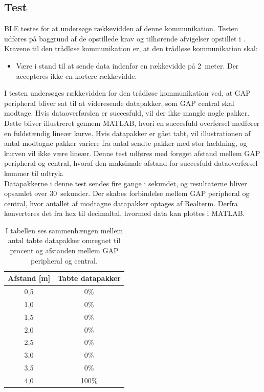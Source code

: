\subsection{Test}
BLE testes for at undersøge rækkevidden af denne kommunikation. Testen udføres på baggrund af de opstillede krav og tilhørende afvigelser opstillet i . Kravene til den trådløse kommunikation er, at den trådløse kommunikation skal:
\begin{itemize}
	\item Være i stand til at sende data indenfor en rækkevidde på 2~meter. Der accepteres ikke en kortere rækkevidde.
\end{itemize}
I testen undersøges rækkevidden for den trådløse kommunikation ved, at GAP peripheral bliver sat til at videresende datapakker, som GAP central skal modtage. Hvis dataoverførslen er succesfuld, vil der ikke mangle nogle pakker. Dette bliver illustreret gennem MATLAB, hvori en succesfuld overførsel medfører en fuldstændig lineær kurve. Hvis datapakker er gået tabt, vil illustrationen af antal modtagne pakker variere fra antal sendte pakker med stor hældning, og kurven vil ikke være lineær. Denne test udføres med forøget afstand mellem GAP peripheral og central, hvoraf den maksimale afstand for succesfuld dataoverførsel kommer til udtryk. \\
Datapakkerne i denne test sendes fire gange i sekundet, og resultaterne bliver opsamlet over 30~sekunder. Der skabes forbindelse mellem GAP peripheral og central, hvor antallet af modtagne datapakker optages af Realterm. Derfra konverteres det fra hex til decimaltal, hvormed data kan plottes i MATLAB.
\begin{table}[H]
	\centering
	\begin{tabular}{cc}
			\hline
		\rowcolor[HTML]{C0C0C0} 
		Afstand {[}m{]} & Tabte datapakker \\ 	\hline
		0,5 	& 0\% \\ 	\hline
		1,0		& 0\% \\	\hline
		1,5 	& 0\% \\	\hline
		2,0		& 0\% \\	\hline
		2,5 	& 0\% \\	\hline
		3,0		& 0\% \\	\hline
		3,5 	& 0\% \\	\hline
		4,0		& 100\% \\	\hline
	\end{tabular}
	\caption{I tabellen ses sammenhængen mellem antal tabte datapakker omregnet til procent og afstanden mellem GAP peripheral og central.}
	\label{test:ble_overforsel}
\end{table}\vspace{-.25cm}
